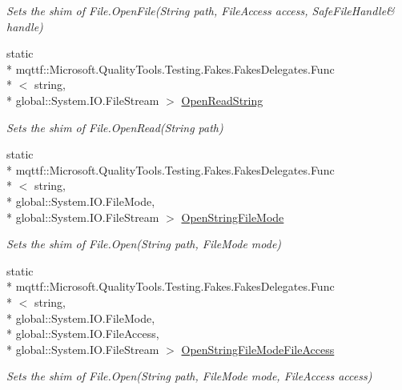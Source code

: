 \begin{DoxyCompactItemize}
\begin{DoxyCompactList}\small\item\em Sets the shim of File.\-Open\-File(String path, File\-Access access, Safe\-File\-Handle\& handle)\end{DoxyCompactList}\item 
static \\*
mqttf\-::\-Microsoft.\-Quality\-Tools.\-Testing.\-Fakes.\-Fakes\-Delegates.\-Func\\*
$<$ string, \\*
global\-::\-System.\-I\-O.\-File\-Stream $>$ \hyperlink{class_system_1_1_i_o_1_1_fakes_1_1_shim_file_a7e3c5f11098199239c27b9d4f090e043}{Open\-Read\-String}
\begin{DoxyCompactList}\small\item\em Sets the shim of File.\-Open\-Read(\-String path)\end{DoxyCompactList}\item 
static \\*
mqttf\-::\-Microsoft.\-Quality\-Tools.\-Testing.\-Fakes.\-Fakes\-Delegates.\-Func\\*
$<$ string, \\*
global\-::\-System.\-I\-O.\-File\-Mode, \\*
global\-::\-System.\-I\-O.\-File\-Stream $>$ \hyperlink{class_system_1_1_i_o_1_1_fakes_1_1_shim_file_ac7e9520ab5cdc2a43d1fe45d60a9a700}{Open\-String\-File\-Mode}
\begin{DoxyCompactList}\small\item\em Sets the shim of File.\-Open(\-String path, File\-Mode mode)\end{DoxyCompactList}\item 
static \\*
mqttf\-::\-Microsoft.\-Quality\-Tools.\-Testing.\-Fakes.\-Fakes\-Delegates.\-Func\\*
$<$ string, \\*
global\-::\-System.\-I\-O.\-File\-Mode, \\*
global\-::\-System.\-I\-O.\-File\-Access, \\*
global\-::\-System.\-I\-O.\-File\-Stream $>$ \hyperlink{class_system_1_1_i_o_1_1_fakes_1_1_shim_file_ab77d3d8929a6e189898543d261995832}{Open\-String\-File\-Mode\-File\-Access}
\begin{DoxyCompactList}\small\item\em Sets the shim of File.\-Open(\-String path, File\-Mode mode, File\-Access access)\end{DoxyCompactList}\item 

\end{DoxyCompactItemize}
